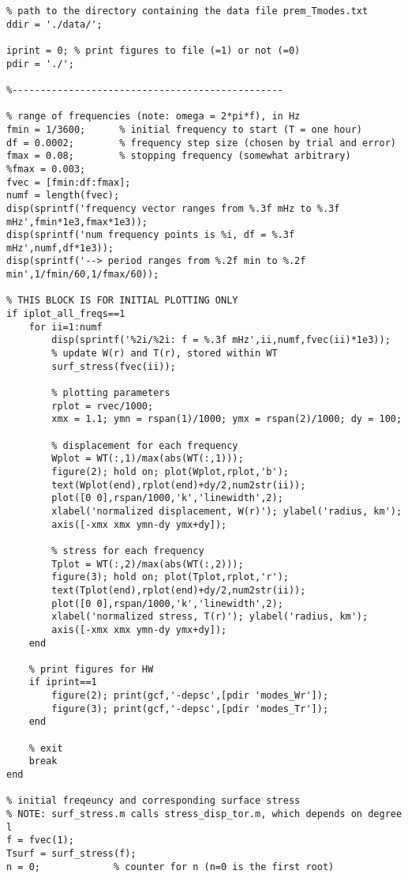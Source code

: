 \documentclass[11pt,titlepage,fleqn]{article}
\begin{document}
\begin{spacing}{1.0}
\begin{verbatim}
% path to the directory containing the data file prem_Tmodes.txt
ddir = './data/';

iprint = 0; % print figures to file (=1) or not (=0)
pdir = './';

%------------------------------------------------

% range of frequencies (note: omega = 2*pi*f), in Hz
fmin = 1/3600;      % initial frequency to start (T = one hour)
df = 0.0002;        % frequency step size (chosen by trial and error)
fmax = 0.08;        % stopping frequency (somewhat arbitrary)
%fmax = 0.003;
fvec = [fmin:df:fmax];
numf = length(fvec);
disp(sprintf('frequency vector ranges from %.3f mHz to %.3f mHz',fmin*1e3,fmax*1e3));
disp(sprintf('num frequency points is %i, df = %.3f mHz',numf,df*1e3));
disp(sprintf('--> period ranges from %.2f min to %.2f min',1/fmin/60,1/fmax/60));

% THIS BLOCK IS FOR INITIAL PLOTTING ONLY
if iplot_all_freqs==1
    for ii=1:numf
        disp(sprintf('%2i/%2i: f = %.3f mHz',ii,numf,fvec(ii)*1e3));
        % update W(r) and T(r), stored within WT
        surf_stress(fvec(ii));
        
        % plotting parameters
        rplot = rvec/1000;
        xmx = 1.1; ymn = rspan(1)/1000; ymx = rspan(2)/1000; dy = 100;

        % displacement for each frequency
        Wplot = WT(:,1)/max(abs(WT(:,1)));
        figure(2); hold on; plot(Wplot,rplot,'b');
        text(Wplot(end),rplot(end)+dy/2,num2str(ii));
        plot([0 0],rspan/1000,'k','linewidth',2);
        xlabel('normalized displacement, W(r)'); ylabel('radius, km');
        axis([-xmx xmx ymn-dy ymx+dy]);

        % stress for each frequency
        Tplot = WT(:,2)/max(abs(WT(:,2)));
        figure(3); hold on; plot(Tplot,rplot,'r');
        text(Tplot(end),rplot(end)+dy/2,num2str(ii));
        plot([0 0],rspan/1000,'k','linewidth',2);
        xlabel('normalized stress, T(r)'); ylabel('radius, km');
        axis([-xmx xmx ymn-dy ymx+dy]);
    end
    
    % print figures for HW
    if iprint==1
        figure(2); print(gcf,'-depsc',[pdir 'modes_Wr']);
        figure(3); print(gcf,'-depsc',[pdir 'modes_Tr']);
    end

    % exit
    break
end

% initial freqeuncy and corresponding surface stress
% NOTE: surf_stress.m calls stress_disp_tor.m, which depends on degree l
f = fvec(1);
Tsurf = surf_stress(f);
n = 0;             % counter for n (n=0 is the first root)


\end{verbatim}
\end{spacing}
\end{document}
